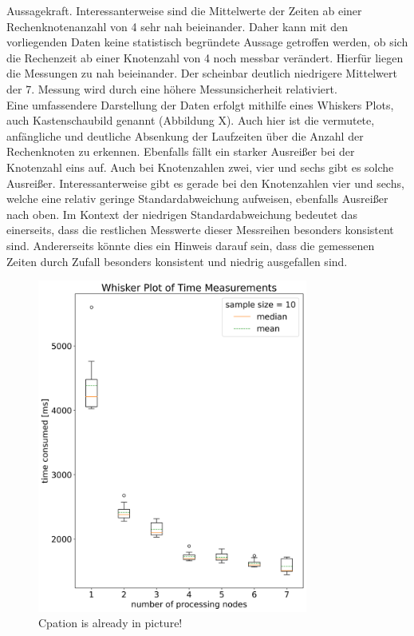 Aussagekraft. Interessanterweise sind die Mittelwerte der Zeiten ab einer Rechenknotenanzahl von 4 sehr nah beieinander. Daher kann mit den vorliegenden Daten keine statistisch begründete Aussage getroffen werden, ob sich die Rechenzeit ab einer Knotenzahl von 4 noch messbar verändert. Hierfür liegen die Messungen zu nah beieinander. Der scheinbar deutlich niedrigere Mittelwert der 7. Messung wird durch eine
höhere Messunsicherheit relativiert.
\\
Eine umfassendere Darstellung der Daten erfolgt mithilfe eines Whiskers Plots, auch Kastenschaubild genannt (Abbildung X). Auch hier ist die vermutete, anfängliche und deutliche 
Absenkung der Laufzeiten über die Anzahl der Rechenknoten zu erkennen. Ebenfalls fällt ein starker Ausreißer bei der Knotenzahl eins auf. Auch bei Knotenzahlen zwei, vier und sechs 
gibt es solche Ausreißer. Interessanterweise gibt es gerade bei den Knotenzahlen vier und sechs, welche eine relativ geringe Standardabweichung aufweisen, ebenfalls Ausreißer nach oben. 
Im Kontext der niedrigen Standardabweichung bedeutet das einerseits, dass die restlichen Messwerte dieser Messreihen besonders konsistent sind. Andererseits könnte dies ein Hinweis darauf sein, dass die gemessenen Zeiten durch Zufall besonders konsistent und niedrig ausgefallen sind.
\begin{figure}[!t]
    \centering
    \includegraphics[width=3.5in]{boxplots.png}
    \caption{Cpation is already in picture!}
    \label{boxplot_times}
\end{figure}
\\
